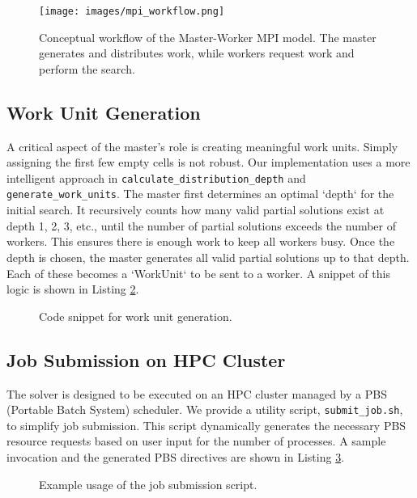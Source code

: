 \begin{figure}[htbp]
\centering
\texttt{[image: images/mpi\_workflow.png]}
\caption{Conceptual workflow of the Master-Worker MPI model. The master generates and distributes work, while workers request work and perform the search.}
\label{fig:mpi_workflow}
\end{figure}

\subsection{Work Unit Generation}
A critical aspect of the master's role is creating meaningful work units. Simply assigning the first few empty cells is not robust. Our implementation uses a more intelligent approach in \texttt{calculate\_distribution\_depth} and \texttt{generate\_work\_units}.
The master first determines an optimal `depth` for the initial search. It recursively counts how many valid partial solutions exist at depth 1, 2, 3, etc., until the number of partial solutions exceeds the number of workers. This ensures there is enough work to keep all workers busy. Once the depth is chosen, the master generates all valid partial solutions up to that depth. Each of these becomes a `WorkUnit` to be sent to a worker. A snippet of this logic is shown in Listing \ref{lst:work_gen}.

\begin{figure}[htbp]
\caption{Code snippet for work unit generation.}
\label{lst:work_gen}

\end{figure}

\subsection{Job Submission on HPC Cluster}
The solver is designed to be executed on an HPC cluster managed by a PBS (Portable Batch System) scheduler. We provide a utility script, \texttt{submit\_job.sh}, to simplify job submission. This script dynamically generates the necessary PBS resource requests based on user input for the number of processes. A sample invocation and the generated PBS directives are shown in Listing \ref{lst:pbs_submit}.

\begin{figure}[htbp]
\caption{Example usage of the job submission script.}
\label{lst:pbs_submit}

\end{figure}